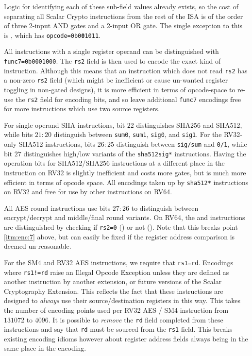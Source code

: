 \noindent
Logic for identifying each of these sub-field values already exists, so
the cost of separating all Scalar Crypto instructions from the rest of the
ISA is of the order of three 2-input AND gates and a 2-input OR gate.
The single exception to this is , which has
{\tt opcode=0b0{\bf 0}1011}.

All instructions with a single register operand can be distinguished
with {\tt func7=0b0001000}.
The {\tt rs2} field is then used to encode the exact kind of instruction.
Although this means that an instruction which does not read {\tt rs2} has
a non-zero {\tt rs2} field (which might be inefficient or cause un-wanted
register toggling in non-gated designs),
it is more efficient in terms of opcode-space to re-use the {\tt rs2} field
for encoding bits, and
so leave additional {\tt func7} encodings free for more instructions which
use two source registers.

For single operand SHA instructions,
bit $22$ distinguishes SHA256 and SHA512, while
bits $21:20$ distinguish between
{\tt sum0},
{\tt sum1},
{\tt sig0},
and
{\tt sig1}.
For the RV32-only SHA512 instructions,
bits $26:25$ distinguish between {\tt sig/sum} and {\tt 0/1},
while bit $27$ distinguishes high/low variants of the {\tt sha512sig*}
instructions.
Having the operation bits for SHA512/SHA256 instructions at a different place
in the instruction on RV32 is slightly inefficient and costs more gates,
but is much more efficient in terms of opcode space.
All encodings taken up by {\tt sha512*} instructions on RV32 and
free for use by other instructions on RV64.

All AES round instructions use bits $27:26$ to distinguish between
encrypt/decrypt and middle/final round variants.
On RV64, the  and  instructions
are distinguished by checking if
{\tt rs2=0} () or not ().
Note that this breaks point \ref{itm:enc:7} above, but can easily be
fixed if the register address comparison is deemed un-reasonable.

For the SM4 and RV32 AES instructions, we require that {\tt rs1=rd}.
Encodings where {\tt rs1!=rd} raise an Illegal Opcode Exception unless
they are defined as another instruction by another extension, or
future versions of the Scalar Cryptography Extension.
This reflects the fact that these instructions are designed to {\em always}
use their source/destination registers in this way.
This takes the number of encoding points used per RV32 AES / SM4 instruction
from $131072$ to $4096$.
It is possible to {\em remove} the {\tt rd} field completed from these
instructions and say that {\tt rd} must be sourced from the {\tt rs1}
field.
This breaks existing encoding idioms however about register address fields
always being in the same place in the encoding.

